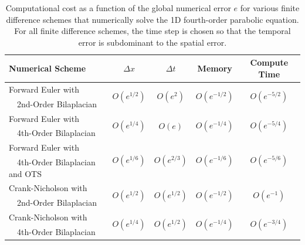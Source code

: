 \documentclass[fleqn,12pt,twoside]{article}
\def\dt{\Delta t}
\def\dx{\Delta x}
\begin{document}
\begin{table}[tb]
\caption{
Computational cost as a function of the global numerical error $e$
for various finite difference schemes that numerically solve the 1D 
fourth-order parabolic equation.  For all finite difference schemes, the 
time step is chosen so that the temporal error is subdominant to the spatial
error.
}
\label{tab:comp_perf_vs_err_4th_order_parabolic} 
\renewcommand{\arraystretch}{1.3}
\begin{tabular}{lcccc}
  \hline
  {\bf Numerical Scheme} & $\dx$ 
  & $\dt$
  & {\bf Memory}
  & {\bf Compute Time}
  \\
  \hline 
  Forward Euler with 
    & \multirow{2}{*}{$O\left( e^{1/2} \right)$} 
    & \multirow{2}{*}{$O\left( e^{2} \right)$}
    & \multirow{2}{*}{$O\left( e^{-1/2} \right)$} 
    & \multirow{2}{*}{$O\left( e^{-5/2} \right)$} \\
  \ \ 2nd-Order Bilaplacian & & & & \\
  Forward Euler with 
    & \multirow{2}{*}{$O\left( e^{1/4} \right)$}
    & \multirow{2}{*}{$O\left( e \right)$}
    & \multirow{2}{*}{$O\left( e^{-1/4} \right)$} 
    & \multirow{2}{*}{$O\left( e^{-{5/4}} \right)$} \\
  \ \ 4th-Order Bilaplacian & & & & \\
  Forward Euler with 
    & \multirow{2}{*}{$O\left( e^{1/6} \right)$} 
    & \multirow{2}{*}{$O\left( e^{2/3} \right)$} 
    & \multirow{2}{*}{$O\left( e^{-1/6} \right)$} 
    & \multirow{2}{*}{$O\left( e^{-5/6} \right)$} \\ 
  \ \ 4th-Order Bilaplacian and OTS & & & & \\
  Crank-Nicholson with 
    & \multirow{2}{*}{$O\left( e^{1/2} \right)$} 
    & \multirow{2}{*}{$O\left( e^{1/2} \right)$} 
    & \multirow{2}{*}{$O\left( e^{-1/2} \right)$} 
    & \multirow{2}{*}{$O\left( e^{-1} \right)$} \\
  \ \ 2nd-Order Bilaplacian & & & & \\
  Crank-Nicholson with 
    & \multirow{2}{*}{$O\left( e^{1/4} \right)$} 
    & \multirow{2}{*}{$O\left( e^{1/2} \right)$} 
    & \multirow{2}{*}{$O\left( e^{-1/4} \right)$} 
    & \multirow{2}{*}{$O\left( e^{-3/4} \right)$} \\
  \ \ 4th-Order Bilaplacian & & & & \\
  \hline
\end{tabular}
\end{table}
\end{document}
